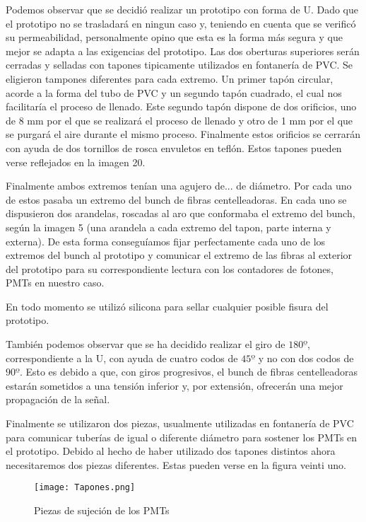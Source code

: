 Podemos observar que se decidió realizar un prototipo con forma de U. Dado que el prototipo no se trasladará en ningun caso y, teniendo en cuenta que se verificó su permeabilidad, personalmente opino que esta es la forma más segura y que mejor se adapta a las exigencias del prototipo. Las dos oberturas superiores serán cerradas y selladas con tapones tipicamente utilizados en fontanería de PVC. Se eligieron tampones diferentes para cada extremo. Un primer tapón circular, acorde a la forma del tubo de PVC y un segundo tapón cuadrado, el cual nos facilitaría el proceso de llenado. Este segundo tapón dispone de dos orificios, uno de 8 mm por el que se realizará el proceso de llenado y otro de 1 mm por el que se purgará el aire durante el mismo proceso. Finalmente estos orificios se cerrarán con ayuda de dos tornillos de rosca envuletos en teflón. Estos tapones pueden verse reflejados en la imagen 20.

Finalmente ambos extremos tenían una agujero de... de diámetro. Por cada uno de estos pasaba un extremo del bunch de fibras centelleadoras. En cada uno se dispusieron dos arandelas, roscadas al aro que conformaba el extremo del bunch, según la imagen 5 (una arandela a cada extremo del tapon, parte interna y externa). De esta forma conseguíamos fijar perfectamente cada uno de los extremos del bunch al prototipo y comunicar el extremo de las fibras al exterior del prototipo para su correspondiente lectura con los contadores de fotones, PMTs en nuestro caso. 

En todo momento se utilizó silicona para sellar cualquier posible fisura del prototipo.

También podemos observar que se ha decidido realizar el giro de $180º$, correspondiente a la U, con ayuda de cuatro codos de $45º$ y no con dos codos de $90º$. Esto es debido a que, con giros progresivos, el bunch de fibras centelleadoras estarán sometidos a una tensión inferior y, por extensión, ofrecerán una mejor propagación de la señal.

Finalmente se utilizaron dos piezas, usualmente utilizadas en fontanería de PVC para comunicar tuberías de igual o diferente diámetro para sostener los PMTs en el prototipo. Debido al hecho de haber utilizado dos tapones distintos ahora necesitaremos dos piezas diferentes. Estas pueden verse en la figura veinti uno.

\begin{figure}[hbtp]
\centering
\texttt{[image: Tapones.png]}
\caption{Piezas de sujeción de los PMTs}
\end{figure}

